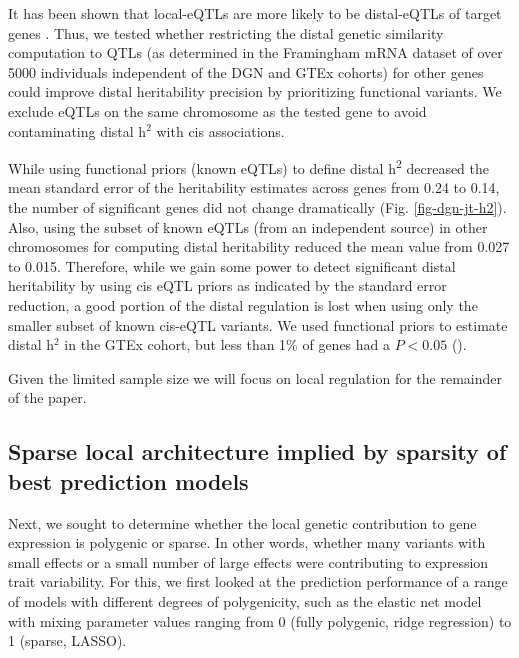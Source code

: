 \documentclass[10pt,letterpaper]{article}
\begin{document}
It has been shown that local-eQTLs are more likely to be distal-eQTLs of target genes \cite{pierce2014mediation}. Thus, we tested whether restricting the distal genetic similarity computation to QTLs (as determined in the Framingham mRNA dataset of over 5000 individuals \cite{Zhang_2015}  independent of the DGN and GTEx cohorts) for other genes could improve distal heritability precision by prioritizing functional variants. We exclude eQTLs on the same chromosome as the tested gene to avoid contaminating distal h$^2$ with cis associations.

While using functional priors (known eQTLs) to define distal h\textsuperscript{2} decreased the mean standard error of the heritability estimates across genes from 0.24 to 0.14, the number of significant genes did not change dramatically (Fig. \ref{fig-dgn-jt-h2}). Also, using the subset of known eQTLs (from an independent source) in other chromosomes for computing distal heritability reduced the mean value from 0.027 to 0.015. Therefore, while we gain some power to detect significant distal heritability by using cis eQTL priors as indicated by the standard error reduction, a good portion of the distal regulation is lost when using only the smaller subset of known cis-eQTL variants. We used functional priors to estimate distal h$^2$ in the GTEx cohort, but less than 1\% of genes had a $P < 0.05$ ().

Given the limited sample size we will focus on local regulation for the remainder of the paper.

\subsection*{Sparse local architecture implied by sparsity of best prediction models }\label{the-effect-of-local-genetic-variation-on-gene-expression-is-sparse-rather-than-polygenic}

Next, we sought to determine whether the local genetic contribution to gene expression is polygenic or sparse. In other words, whether many variants with small effects or a small number of large effects were contributing to expression trait variability. For this, we first looked at the prediction performance of a range of models with different degrees of polygenicity, such as the elastic net model with  mixing parameter values ranging from 0 (fully polygenic, ridge regression) to 1 (sparse, LASSO).
\end{document}
